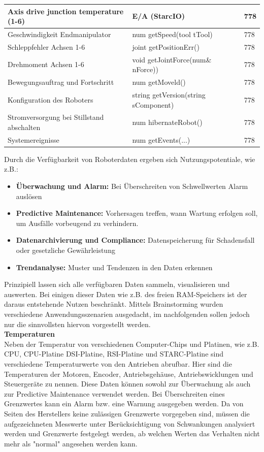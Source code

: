 \documentclass[ a4paper,
                oneside,
                toc=bibliography,
                toc=listof
                ]{scrbook}
\begin{document}
\begin{longtable}{|p{6cm}|p{4cm}|p{4cm}|}
		Axis drive junction temperature (1-6) & E/A (StarcIO) & 778 \\		
		\hline
		Geschwindigkeit Endmanipulator & num getSpeed(tool tTool) & 778 \\
		Schleppfehler Achsen 1-6 & joint getPositionErr()  & 778 \\
		Drehmoment Achsen 1-6 & void getJointForce(num\& nForce))  & 778 \\
		Bewegungsauftrag und Fortschritt &num getMoveld()  & 778 \\
		Konfiguration des Roboters &string getVersion(string sComponent)  & 778 \\
		Stromversorgung bei Stillstand abschalten &num hibernateRobot()  & 778 \\
		Systemereignisse &num getEvents(...)  & 778 \\
			
	\end{longtable}
	Durch die Verfügbarkeit von Roboterdaten ergeben sich Nutzungspotentiale, wie z.B.:
	\begin{itemize}
		\item \textbf{Überwachung und Alarm:} Bei Überschreiten von Schwellwerten Alarm auslösen
		\item \textbf{Predictive Maintenance:} Vorhersagen treffen, wann Wartung erfolgen soll, um Ausfälle vorbeugend zu verhindern.
		\item \textbf{Datenarchivierung und Compliance:} Datenspeicherung für Schadensfall oder gesetzliche Gewährleistung
		\item \textbf{Trendanalyse:} Muster und Tendenzen in den Daten erkennen
	\end{itemize}
	
 	Prinzipiell lassen sich alle verfügbaren Daten sammeln, visualisieren und auswerten. Bei einigen dieser Daten wie z.B. des freien RAM-Speichers ist der daraus entstehende Nutzen beschränkt.	Mittels Brainstorming wurden verschiedene Anwendungsszenarien ausgedacht, im nachfolgenden sollen jedoch nur die sinnvollsten hiervon vorgestellt werden.\\
 	\textbf{Temperaturen}\\
 	Neben der Temperatur von verschiedenen Computer-Chips und Platinen, wie z.B. CPU, CPU-Platine DSI-Platine, RSI-Platine und STARC-Platine sind verschiedene Temperaturwerte von den Antrieben abrufbar. Hier sind die Temperaturen der Motoren, Encoder, Antriebsgehäuse,  Antriebswicklungen und  Steuergeräte zu nennen. Diese Daten können sowohl zur Überwachung als auch zur Predictive Maintenance verwendet werden. Bei Überschreiten eines Grenzwertes kann ein Alarm bzw. eine Warnung ausgegeben werden. Da von Seiten des Herstellers keine zulässigen Grenzwerte vorgegeben sind, müssen die aufgezeichneten Messwerte unter Berücksichtigung von Schwankungen analysiert werden und Grenzwerte festgelegt werden, ab welchen Werten das Verhalten nicht mehr als "normal" angesehen werden kann.
	
\end{document}

